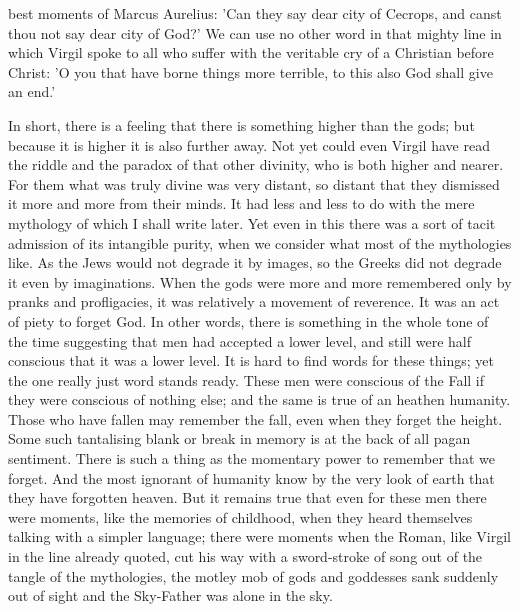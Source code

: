 best moments of Marcus Aurelius: 'Can they say dear city of Cecrops, and canst thou not say dear city of God?' We can use no other word in that mighty line in which Virgil spoke to all who suffer with the veritable cry of a Christian before Christ: 'O you that have borne things more terrible, to this also God shall give an end.'

In short, there is a feeling that there is something higher than the gods; but because it is higher it is also further away. Not yet could even Virgil have read the riddle and the paradox of that other divinity, who is both higher and nearer. For them what was truly divine was very distant, so distant that they dismissed it more and more from their minds. It had less and less to do with the mere mythology of which I shall write later. Yet even in this there was a sort of tacit admission of its intangible purity, when we consider what most of the mythologies like. As the Jews would not degrade it by images, so the Greeks did not degrade it even by imaginations. When the gods were more and more remembered only by pranks and profligacies, it was relatively a movement of reverence. It was an act of piety to forget God. In other words, there is something in the whole tone of the time suggesting that men had accepted a lower level, and still were half conscious that it was a lower level. It is hard to find words for these things; yet the one really just word stands ready. These men were conscious of the Fall if they were conscious of nothing else; and the same is true of an heathen humanity. Those who have fallen may remember the fall, even when they forget the height. Some such tantalising blank or break in memory is at the back of all pagan sentiment. There is such a thing as the momentary power to remember that we forget. And the most ignorant of humanity know by the very look of earth that they have forgotten heaven. But it remains true that even for these men there were moments, like the memories of childhood, when they heard themselves talking with a simpler language; there were moments when the Roman, like Virgil in the line already quoted, cut his way with a sword-stroke of song out of the tangle of the mythologies, the motley mob of gods and goddesses sank suddenly out of sight and the Sky-Father was alone in the sky.

